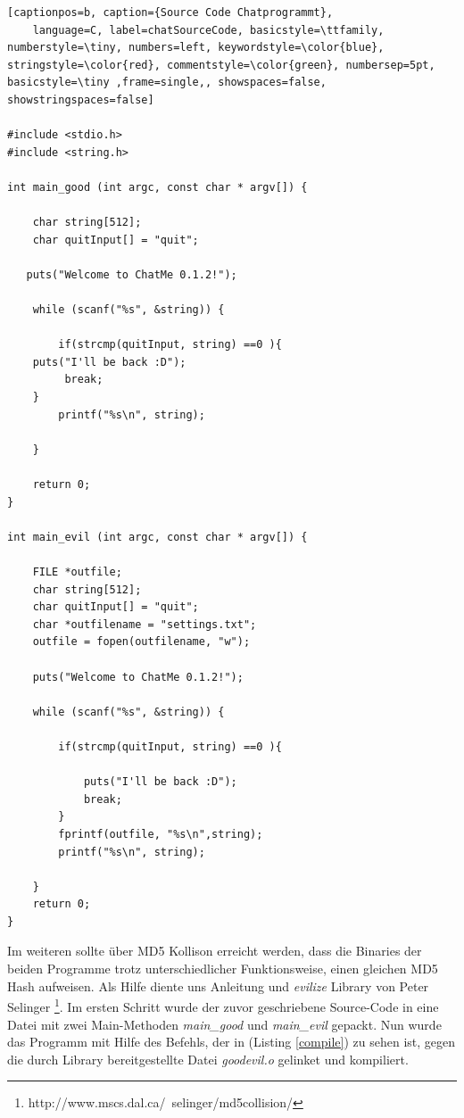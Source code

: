 \documentclass[12pt]{article}
\begin{document}
\begin{lstlisting}[captionpos=b, caption={Source Code Chatprogrammt},
	language=C, label=chatSourceCode, basicstyle=\ttfamily, numberstyle=\tiny, numbers=left, keywordstyle=\color{blue}, stringstyle=\color{red}, commentstyle=\color{green}, numbersep=5pt, basicstyle=\tiny ,frame=single,, showspaces=false, showstringspaces=false]

#include <stdio.h>
#include <string.h>

int main_good (int argc, const char * argv[]) {

    char string[512];
    char quitInput[] = "quit";
   
   puts("Welcome to ChatMe 0.1.2!");
    
    while (scanf("%s", &string)) {
    
    	if(strcmp(quitInput, string) ==0 ){
	puts("I'll be back :D");
         break;
    }
        printf("%s\n", string);
        
    }
    
    return 0;
}

int main_evil (int argc, const char * argv[]) {
    
    FILE *outfile;
    char string[512];
    char quitInput[] = "quit";
    char *outfilename = "settings.txt";
    outfile = fopen(outfilename, "w");
    
    puts("Welcome to ChatMe 0.1.2!");
    
    while (scanf("%s", &string)) {
        
        if(strcmp(quitInput, string) ==0 ){
            
            puts("I'll be back :D");
            break;
        }
        fprintf(outfile, "%s\n",string);
        printf("%s\n", string);
        
    }
    return 0;
}
\end{lstlisting}

Im weiteren sollte über MD5 Kollison erreicht werden, dass die Binaries der beiden Programme trotz unterschiedlicher Funktionsweise, einen gleichen MD5 Hash aufweisen. 
Als Hilfe diente uns Anleitung und \textit{evilize} Library von Peter Selinger \footnote{http://www.mscs.dal.ca/~selinger/md5collision/}. Im ersten Schritt wurde der zuvor geschriebene Source-Code in eine Datei mit zwei Main-Methoden  \textit{main\_good} und  \textit{main\_evil} gepackt. Nun wurde das Programm mit Hilfe des Befehls, der in (Listing \ref{compile}) zu sehen ist, gegen die durch Library bereitgestellte Datei \textit{goodevil.o} gelinket und kompiliert.
\end{document}
